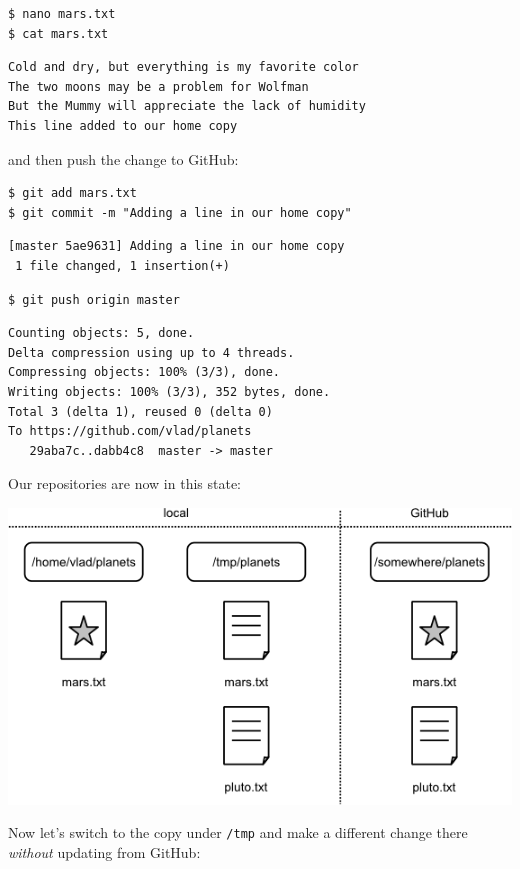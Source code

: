 \documentclass{book}
\begin{document}
\begin{verbatim}
$ nano mars.txt
$ cat mars.txt
\end{verbatim}

\begin{verbatim}
Cold and dry, but everything is my favorite color
The two moons may be a problem for Wolfman
But the Mummy will appreciate the lack of humidity
This line added to our home copy
\end{verbatim}

and then push the change to GitHub:

\begin{verbatim}
$ git add mars.txt
$ git commit -m "Adding a line in our home copy"
\end{verbatim}

\begin{verbatim}
[master 5ae9631] Adding a line in our home copy
 1 file changed, 1 insertion(+)
\end{verbatim}

\begin{verbatim}
$ git push origin master
\end{verbatim}

\begin{verbatim}
Counting objects: 5, done.
Delta compression using up to 4 threads.
Compressing objects: 100% (3/3), done.
Writing objects: 100% (3/3), 352 bytes, done.
Total 3 (delta 1), reused 0 (delta 0)
To https://github.com/vlad/planets
   29aba7c..dabb4c8  master -> master
\end{verbatim}

Our repositories are now in this state:

\includegraphics{novice/git/img/git-after-first-conflicting-change.png}

Now let's switch to the copy under \texttt{/tmp} and make a different
change there \emph{without} updating from GitHub:
\end{document}
